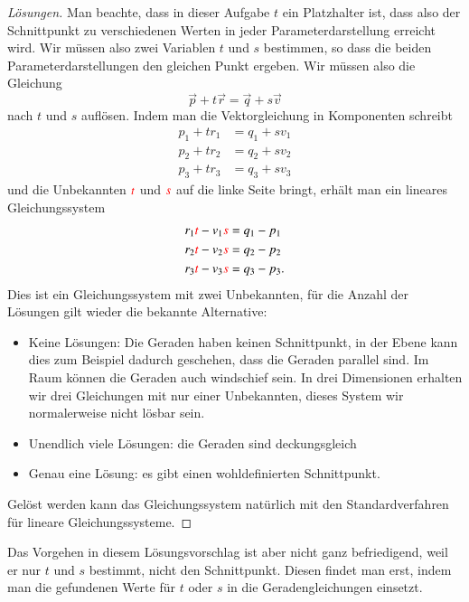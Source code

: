 \begin{proof}[Lösungen]
Man beachte, dass in dieser Aufgabe $t$ ein Platzhalter ist, dass also
der Schnittpunkt zu verschiedenen Werten in jeder Parameterdarstellung
erreicht wird.
Wir müssen also zwei Variablen $t$ und $s$ bestimmen, so dass die beiden
Parameterdarstellungen den gleichen Punkt ergeben.
Wir müssen also die Gleichung
\[
\vec{p} + t\vec{r}
=
\vec{q} + s\vec{v}
\]
nach $t$ und $s$ auflösen.
Indem man die Vektorgleichung in Komponenten schreibt
\begin{align*}
p_1+tr_1 &= q_1+sv_1\\
p_2+tr_2 &= q_2+sv_2\\
p_3+tr_3 &= q_3+sv_3
\end{align*}
und die Unbekannten $\color{red}t$ und $\color{red}s$ auf die linke Seite bringt, erhält
man ein lineares Gleichungssystem 
\begin{align*}
r_1{\color{red}t}-v_1{\color{red}s}&= q_1-p_1\\
r_2{\color{red}t}-v_2{\color{red}s}&= q_2-p_2\\
r_3{\color{red}t}-v_3{\color{red}s}&= q_3-p_3.
\end{align*}
Dies ist ein Gleichungssystem mit zwei Unbekannten, für die Anzahl der Lösungen
gilt wieder die bekannte Alternative:
\begin{itemize}
\item Keine Lösungen: Die Geraden haben keinen Schnittpunkt, in der Ebene
kann dies zum Beispiel dadurch geschehen, dass die Geraden parallel sind.
Im Raum können die Geraden auch windschief sein.
In drei Dimensionen erhalten wir drei Gleichungen mit nur einer Unbekannten,
dieses System wir normalerweise nicht lösbar sein.
\item Unendlich viele Lösungen: die Geraden sind deckungsgleich
\item Genau eine Lösung: es gibt einen wohldefinierten Schnittpunkt.
\end{itemize}
Gelöst werden kann das Gleichungssystem natürlich mit den Standardverfahren
für lineare Gleichungssysteme.
\end{proof}

Das Vorgehen in diesem Lösungsvorschlag ist aber nicht ganz befriedigend,
weil er nur $t$ und $s$ bestimmt, nicht den Schnittpunkt.
Diesen findet man erst, indem man die gefundenen Werte für $t$ oder $s$
in die Geradengleichungen einsetzt.

